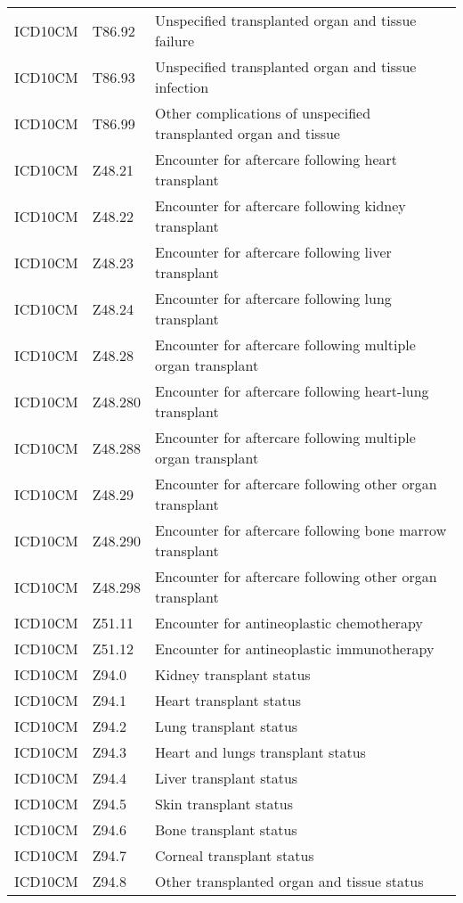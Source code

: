 \begin{longtable}{p{}p{}p{}}
  ICD10CM & T86.92 & Unspecified transplanted organ and tissue failure \\ 
  ICD10CM & T86.93 & Unspecified transplanted organ and tissue infection \\ 
  ICD10CM & T86.99 & Other complications of unspecified transplanted organ and tissue \\ 
  ICD10CM & Z48.21 & Encounter for aftercare following heart transplant \\ 
  ICD10CM & Z48.22 & Encounter for aftercare following kidney transplant \\ 
  ICD10CM & Z48.23 & Encounter for aftercare following liver transplant \\ 
  ICD10CM & Z48.24 & Encounter for aftercare following lung transplant \\ 
  ICD10CM & Z48.28 & Encounter for aftercare following multiple organ transplant \\ 
  ICD10CM & Z48.280 & Encounter for aftercare following heart-lung transplant \\ 
  ICD10CM & Z48.288 & Encounter for aftercare following multiple organ transplant \\ 
  ICD10CM & Z48.29 & Encounter for aftercare following other organ transplant \\ 
  ICD10CM & Z48.290 & Encounter for aftercare following bone marrow transplant \\ 
  ICD10CM & Z48.298 & Encounter for aftercare following other organ transplant \\ 
  ICD10CM & Z51.11 & Encounter for antineoplastic chemotherapy \\ 
  ICD10CM & Z51.12 & Encounter for antineoplastic immunotherapy \\ 
  ICD10CM & Z94.0 & Kidney transplant status \\ 
  ICD10CM & Z94.1 & Heart transplant status \\ 
  ICD10CM & Z94.2 & Lung transplant status \\ 
  ICD10CM & Z94.3 & Heart and lungs transplant status \\ 
  ICD10CM & Z94.4 & Liver transplant status \\ 
  ICD10CM & Z94.5 & Skin transplant status \\ 
  ICD10CM & Z94.6 & Bone transplant status \\ 
  ICD10CM & Z94.7 & Corneal transplant status \\ 
  ICD10CM & Z94.8 & Other transplanted organ and tissue status \\ 

\end{longtable}

